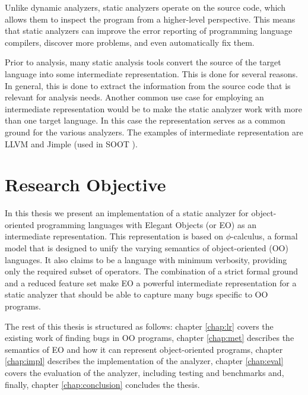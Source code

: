 Unlike dynamic analyzers, static analyzers operate on the source code, which allows them to inspect the program from a higher-level perspective. This means that static analyzers can improve the error reporting of programming language compilers, discover more problems, and  even automatically fix them.

Prior to analysis, many static analysis tools convert the source of the target language into some intermediate representation. This is done for several reasons. In general, this is done to extract the information from the source code that is relevant for analysis needs. Another common use case for employing an intermediate representation would be to
make the static analyzer work with more than one target language. In this case the representation serves as a common ground for the various analyzers. The examples of  intermediate representation are LLVM \cite{llvm} and Jimple \cite{vallee1998jimple} (used in SOOT \cite{vallee2010soot}).

\section{Research Objective}

In this thesis we present an implementation of a static analyzer for object-oriented programming languages with Elegant Objects \cite{eolang} (or EO) as an intermediate representation. This representation is based on $\phi$-calculus, a formal model that is designed to unify the varying semantics of object-oriented (OO) languages. It also claims to be a language with minimum verbosity, providing only the required subset of operators. The combination of a strict formal ground and a reduced feature set make EO a powerful intermediate representation for a static analyzer that should be able to capture many bugs specific to OO programs.

The rest of this thesis is structured as follows: chapter \ref{chap:lr} covers the existing work of finding bugs in OO programs, chapter \ref{chap:met} describes the semantics of EO and how it can represent object-oriented programs, chapter \ref{chap:impl} describes the implementation of the analyzer, chapter \ref{chap:eval} covers the evaluation of the analyzer, including testing and benchmarks and, finally, chapter \ref{chap:conclusion} concludes the thesis.
